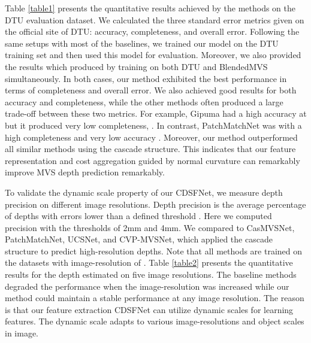 \documentclass{article} \usepackage{iclr2022_conference,times}
\begin{document}
Table \ref{table1} presents the quantitative results achieved by the methods on the DTU evaluation dataset. We calculated the three standard error metrics \citep{aanaes2016large} given on the official site of DTU: accuracy, completeness, and overall error. Following the same setups with most of the baselines, we trained our model on the DTU training set and then used this model for evaluation. Moreover, we also provided the results which produced by training on both DTU and BlendedMVS simultaneously. In both cases, our method exhibited the best performance in terms of completeness and overall error. We also achieved good results for both accuracy and completeness, while the other methods often produced a large trade-off between these two metrics. For example, Gipuma had a high accuracy at  but it produced very low completeness, . In contrast, PatchMatchNet was with a high completeness  and very low accuracy . Moreover, our method outperformed all similar methods using the cascade structure. This indicates that our feature representation and cost aggregation guided by normal curvature can remarkably improve MVS depth prediction remarkably. 

To validate the dynamic scale property of our CDSFNet, we measure depth precision on different image resolutions. Depth precision is the average percentage of depths with errors lower than a defined threshold \citep{gu2020cascade}. Here we computed precision with the thresholds of 2mm and 4mm. We compared to CasMVSNet, PatchMatchNet, UCSNet, and CVP-MVSNet, which applied the cascade structure to predict high-resolution depths. Note that all methods are trained on the datasets with image-resolution of . Table \ref{table2} presents the quantitative results for the depth estimated on five image resolutions. The baseline methods degraded the performance when the image-resolution was increased while our method could maintain a stable performance at any image resolution. The reason is that our feature extraction CDSFNet can utilize dynamic scales for learning features. The dynamic scale adapts to various image-resolutions and object scales in image.
\end{document}
